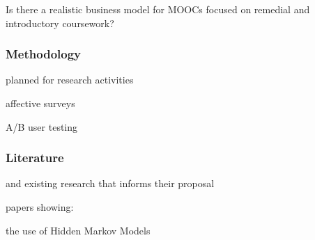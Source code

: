 \documentclass[12pt]{article}
\begin{document}
Is there a realistic business model for MOOCs focused on remedial and introductory coursework?

\subsubsection*{Methodology}

planned for research activities

affective surveys

A/B user testing

\subsubsection*{Literature}



and existing research
that informs their proposal
 
papers showing: 

the use of Hidden Markov Models
\end{document}
